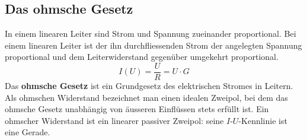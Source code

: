 \subsection{Das ohmsche Gesetz}
In einem linearen Leiter sind Strom und Spannung zueinander proportional. Bei einem linearen Leiter ist der ihn durchfliessenden Strom der angelegten Spannung proportional und dem Leiterwiderstand gegenüber umgekehrt proportional.
\begin{equation}
\boxed{I\left(U\right)=\dfrac{U}{R}=U\cdot G}
\end{equation}
Das \textbf{ohmsche Gesetz} ist ein Grundgesetz des elektrischen Stromes in Leitern. Als ohmschen Widerstand bezeichnet man einen idealen Zweipol, bei dem das ohmsche Gesetz unabhängig von äusseren Einflüssen stets erfüllt ist. Ein ohmscher Widerstand ist ein linearer passiver Zweipol: seine $I$-$U$-Kennlinie ist eine Gerade.
